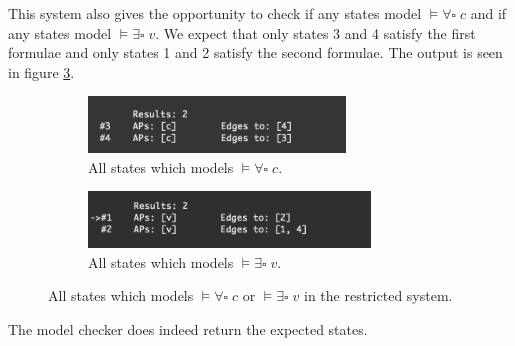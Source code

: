 This system also gives the opportunity to check if any states model $\models \forall \square \; c$ and if any states model $\models \exists \square \; v$. We expect that only states 3 and 4 satisfy the first formulae and only states 1 and 2 satisfy the second formulae. The output is seen in figure \ref{fig:rsAGcANDrsEGv}.

\begin{figure}[H]
    \begin{subfigure}{0.495\textwidth}
         \centering
        \includegraphics[width=0.9\linewidth, height=1.5cm]{fig/rsAGc.png} 
        \caption{All states which models $\models \forall \square \; c$.}
        \label{fig:rsAGc}
        \end{subfigure}
    \begin{subfigure}{0.495\textwidth}
         \centering
        \includegraphics[width=0.9\linewidth, height=1.5cm]{fig/rsEGv.png}
        \caption{All states which models $\models \exists \square \; v$.}
        \label{fig:rsEGv}
    \end{subfigure}
     \caption{All states which models $\models \forall \square \; c$ or $\models \exists \square \; v$ in the restricted system.}
    \label{fig:rsAGcANDrsEGv}
\end{figure}

The model checker does indeed return the expected states.


